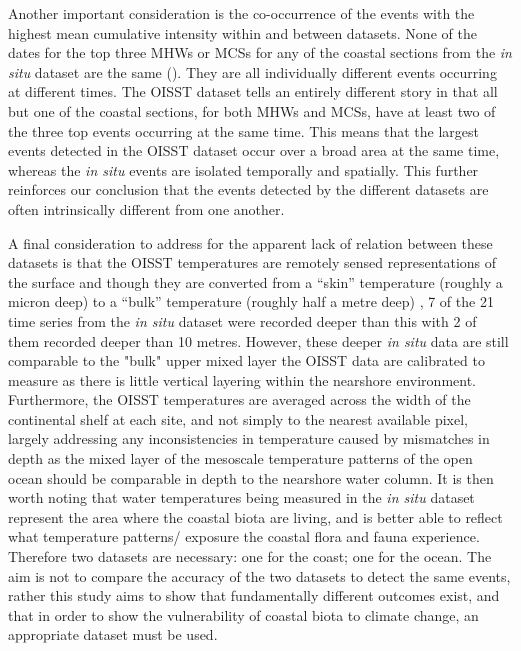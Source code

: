 \documentclass[a4paper,10pt,review]{elsarticle}
\begin{document}
Another important consideration is the co-occurrence of the events with the highest mean cumulative intensity within and between datasets. None of the dates for the top three MHWs or MCSs for any of the coastal sections from the \emph{in situ} dataset are the same (). They are all individually different events occurring at different times. The OISST dataset tells an entirely different story in that all but one of the coastal sections, for both MHWs and MCSs, have at least two of the three top events occurring at the same time. This means that the largest events detected in the OISST dataset occur over a broad area at the same time, whereas the \emph{in situ} events are isolated temporally and spatially. This further reinforces our conclusion that the events detected by the different datasets are often intrinsically different from one another.

A final consideration to address for the apparent lack of relation between these datasets is that the OISST temperatures are remotely sensed representations of the surface and though they are converted from a ``skin'' temperature (roughly a micron deep) to a ``bulk'' temperature (roughly half a metre deep) \citep{Reynolds2007}, 7 of the 21 time series from the \emph{in situ} dataset were recorded deeper than this with 2 of them recorded deeper than 10 metres. However, these deeper \emph{in situ} data are still comparable to the "bulk" upper mixed layer the OISST data are calibrated to measure as there is little vertical layering within the nearshore environment. Furthermore, the OISST temperatures are averaged across the width of the continental shelf at each site, and not simply to the nearest available pixel, largely addressing any inconsistencies in temperature caused by mismatches in depth as the mixed layer of the mesoscale temperature patterns of the open ocean should be comparable in depth to the nearshore water column. It is then worth noting that water temperatures being measured in the \emph{in situ} dataset represent the area where the coastal biota are living, and is better able to reflect what temperature patterns/ exposure the coastal flora and fauna experience. Therefore two datasets are necessary: one for the coast; one for the ocean. The aim is not to compare the accuracy of the two datasets to detect the same events, rather this study aims to show that fundamentally different outcomes exist, and that in order to show the vulnerability of coastal biota to climate change, an appropriate dataset must be used.
\end{document}
